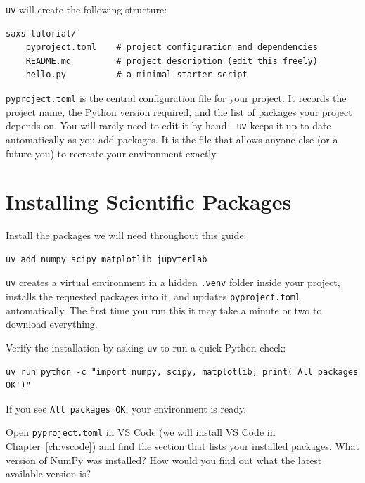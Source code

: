 \documentclass[nobib]{tufte-book}
\begin{document}
\texttt{uv} will create the following structure:

\begin{lstlisting}[style=bashstyle]
saxs-tutorial/
    pyproject.toml    # project configuration and dependencies
    README.md         # project description (edit this freely)
    hello.py          # a minimal starter script
\end{lstlisting}

\begin{notebox}[title={What is \texttt{pyproject.toml}?}]
\texttt{pyproject.toml} is the central configuration file for your project.
It records the project name, the Python version required, and the list of
packages your project depends on.
You will rarely need to edit it by hand---\texttt{uv} keeps it up to date
automatically as you add packages.
It is the file that allows anyone else (or a future you) to recreate your
environment exactly.
\end{notebox}

\section{Installing Scientific Packages}

Install the packages we will need throughout this guide:

\begin{lstlisting}[style=bashstyle]
uv add numpy scipy matplotlib jupyterlab
\end{lstlisting}

\texttt{uv} creates a virtual environment in a hidden \texttt{.venv} folder
inside your project, installs the requested packages into it, and updates
\texttt{pyproject.toml} automatically.
The first time you run this it may take a minute or two to download
everything.

Verify the installation by asking \texttt{uv} to run a quick Python check:

\begin{lstlisting}[style=bashstyle]
uv run python -c "import numpy, scipy, matplotlib; print('All packages OK')"
\end{lstlisting}

If you see \texttt{All packages OK}, your environment is ready.

\begin{exercisebox}
Open \texttt{pyproject.toml} in VS Code (we will install VS Code in
Chapter~\ref{ch:vscode}) and find the section that lists your installed
packages.
What version of NumPy was installed?
How would you find out what the latest available version is?
\end{exercisebox}
\end{document}
